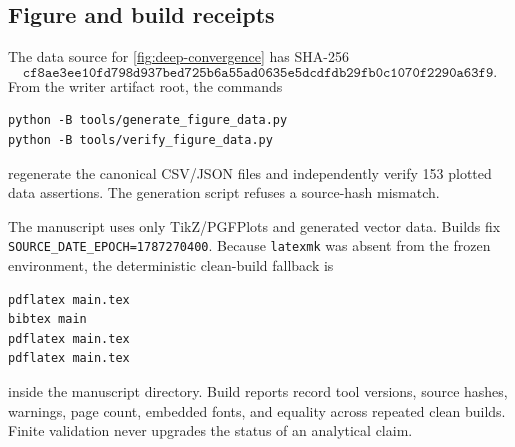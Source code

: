 \subsection{Figure and build receipts}

The data source for \cref{fig:deep-convergence} has SHA-256
\[
\texttt{cf8ae3ee10fd798d937bed725b6a55ad0635e5dcdfdb29fb0c1070f2290a63f9}.
\]
From the writer artifact root, the commands
\begin{verbatim}
python -B tools/generate_figure_data.py
python -B tools/verify_figure_data.py
\end{verbatim}
regenerate the canonical CSV/JSON files and independently verify 153 plotted
data assertions.  The generation script refuses a source-hash mismatch.

The manuscript uses only TikZ/PGFPlots and generated vector data.  Builds fix
\texttt{SOURCE\_DATE\_EPOCH=1787270400}.  Because \texttt{latexmk} was absent
from the frozen environment, the deterministic clean-build fallback is
\begin{verbatim}
pdflatex main.tex
bibtex main
pdflatex main.tex
pdflatex main.tex
\end{verbatim}
inside the manuscript directory.  Build reports record tool versions, source
hashes, warnings, page count, embedded fonts, and equality across repeated
clean builds.  Finite validation never upgrades the status of an analytical
claim.
